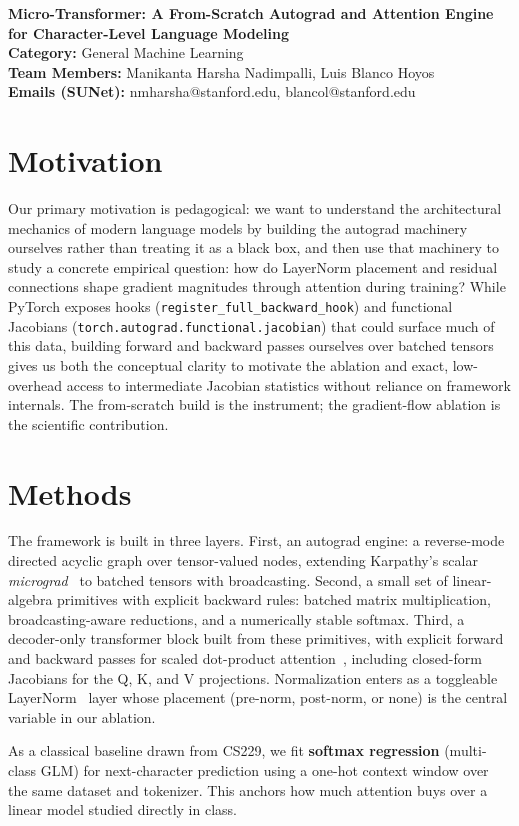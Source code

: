 \documentclass{article}
\makeatletter
\renewcommand{\maketitle}{
  \begin{center}
    {\bf \large Micro-Transformer: A From-Scratch Autograd and Attention Engine for Character-Level Language Modeling}\\
    \vspace{0.1cm}
    {\bf Category:} General Machine Learning\\
    \vspace{0.1cm}
    {\bf Team Members:} Manikanta Harsha Nadimpalli, Luis Blanco Hoyos\\
    \vspace{0.1cm}
    {\bf Emails (SUNet):} nmharsha@stanford.edu, blancol@stanford.edu\\
    \vspace{0.2cm}
  \end{center}
}
\makeatother
\begin{document}
\maketitle

\section{Motivation}
Our primary motivation is pedagogical: we want to understand the architectural mechanics of modern language models by building the autograd machinery ourselves rather than treating it as a black box, and then use that machinery to study a concrete empirical question: how do LayerNorm placement and residual connections shape gradient magnitudes through attention during training? While PyTorch exposes hooks (\texttt{register\_full\_backward\_hook}) and functional Jacobians (\texttt{torch.autograd.functional.jacobian}) that could surface much of this data, building forward and backward passes ourselves over batched tensors gives us both the conceptual clarity to motivate the ablation and exact, low-overhead access to intermediate Jacobian statistics without reliance on framework internals. The from-scratch build is the instrument; the gradient-flow ablation is the scientific contribution.

\section{Methods}
The framework is built in three layers. First, an autograd engine: a reverse-mode directed acyclic graph over tensor-valued nodes, extending Karpathy's scalar \textit{micrograd}~\cite{karpathy2020micrograd} to batched tensors with broadcasting. Second, a small set of linear-algebra primitives with explicit backward rules: batched matrix multiplication, broadcasting-aware reductions, and a numerically stable softmax. Third, a decoder-only transformer block built from these primitives, with explicit forward and backward passes for scaled dot-product attention~\cite{vaswani2017attention}, including closed-form Jacobians for the Q, K, and V projections. Normalization enters as a toggleable LayerNorm~\cite{ba2016layernorm} layer whose placement (pre-norm, post-norm, or none) is the central variable in our ablation.

As a classical baseline drawn from CS229, we fit \textbf{softmax regression} (multi-class GLM) for next-character prediction using a one-hot context window over the same dataset and tokenizer. This anchors how much attention buys over a linear model studied directly in class.
\end{document}

